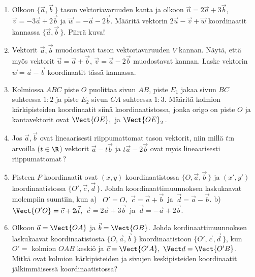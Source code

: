 \begin{enumerate}
\item
Olkoon $\{\vec a,\vec b\,\}$ tason vektoriavaruuden kanta ja olkoon $\vec u=2\vec a+3\vec b$,
$\vec v=-3\vec a+2\vec b$ ja $\vec w=-\vec a-2\vec b$. Määritä vektorin $2\vec u-\vec v+\vec w$
koordinaatit kannassa $\{\vec a,\vec b\,\}$. Piirrä kuva!

\item
Vektorit $\vec a,\vec b$ muodostavat tason vektoriavaruuden $V$ kannan. Näytä, että myös 
vektorit $\vec u=\vec a+\vec b$, $\vec v=\vec a-2\vec b$ muodostavat kannan. Laske 
vektorin $\vec w=\vec a-\vec b$ koor\-di\-naa\-tit tässä kannassa.

\item
Kolmiossa $ABC$ piste $O$ puolittaa sivun $AB$, piste $E_1$ jakaa sivun $BC$ suhteessa $1:2$
ja piste $E_2$ sivun $CA$ suhteessa $1:3$. Määritä kolmion kärkipisteiden koordinaatit siinä
koordinaatistossa, jonka origo on piste $O$ ja kantavektorit ovat $\Vect{OE}_1$ ja
$\Vect{OE}_2\,$.

\item 
Jos $\vec a,\vec b$ ovat lineaarisesti riippumattomat tason vektorit, niin millä $t$:n arvoilla
($t\in\R$) vektorit $\vec a-t\vec b$ ja $t\vec a-2\vec b$ ovat myös lineaarisesti
riippumattomat\,?

\item
Pisteen $P$ koordinaatit ovat $(x,y)$ koordinaatistossa $\{O,\vec a,\vec b\,\}$ ja $(x',y')$ 
koordinaatistossa $\{O',\vec c,\vec d\,\}$. Johda koordinaattimuunnoksen laskukaavat molempiin
suuntiin, kun \newline
a) \ $O'=O$, $\,\vec c=\vec a+\vec b\,$ ja $\,\vec d=\vec a-\vec b$. \newline
b) \ $\Vect{O'O}=\vec c+2\vec d$, $\,\vec c=2\vec a+3\vec b\,$ ja $\,\vec d=-\vec a+2\vec b$. 

\item
Olkoon $\vec a=\Vect{OA}$ ja $\vec b=\Vect{OB}$. Johda kordinaattimuunnoksen laskukaavat 
koordinaatistosta $\{O,\vec a,\vec b\,\}$ koordinaatistoon $\{O',\vec c,\vec d\,\}$,
kun $O'=$ kolmion $OAB$ keskiö ja $\vec c=\Vect{O'A},\ \Vect d=\Vect{O'B}$. Mitkä ovat kolmion
kärkipisteiden ja sivujen keskipisteiden koordinaatit jälkimmäisessä koordinaatistossa?

\end{enumerate}